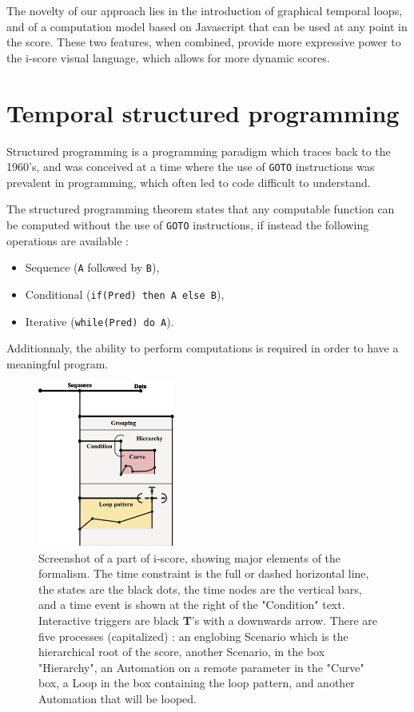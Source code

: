 \documentclass{article}
\begin{document}
The novelty of our approach lies in the introduction of graphical temporal loops, and of a computation model 
based on Javascript that can be used at any point in the score. 
These two features, when combined, provide more expressive power to the i-score visual language, 
which allows for more dynamic scores.

\section{Temporal structured programming}
Structured programming is a programming paradigm which traces 
back to the 1960's, and was conceived at a time where the use of \lstinline{GOTO}
instructions was prevalent in programming, which often led to code difficult to understand.

The structured programming theorem\cite{bohm1966flow,mills1972mathematical} states that any computable function can be computed 
without the use of \lstinline{GOTO} instructions, if instead the following operations are available : 
\begin{itemize}
    \item Sequence (\lstinline{A} followed by \lstinline{B}), 
    \item Conditional (\lstinline{if(Pred) then A else B}), 
    \item Iterative (\lstinline{while(Pred) do A}).
\end{itemize}

Additionnaly, the ability to perform computations is required in order to have a meaningful program.

\begin{figure}
    \centering
    \includegraphics[width=0.40\textwidth]{images/hierarchy.eps}
    \caption{Screenshot of a part of i-score, showing major elements of the formalism. The time constraint is the full or dashed horizontal line, the states are the black dots, the time nodes are the vertical bars, and a time event is shown at the right of the "Condition" text. Interactive triggers are black \textbf{T}'s with a downwards arrow. There are five processes (capitalized) : an englobing Scenario which is the hierarchical root of the score, another Scenario, in the box "Hierarchy", an Automation on a remote parameter in the "Curve" box, a Loop in the box containing the loop pattern, and another Automation that will be looped.}
    \label{fig.hierarchy}
\end{figure}
\end{document}
